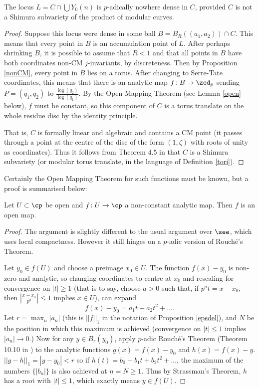 \documentclass[12pt,letterpaper]{article}
\begin{document}
	\begin{prop}
		The locus $L=C\cap \bigcup Y_0(n)$ is $p$-adically nowhere dense in $C$, provided $C$ is not a Shimura subvariety of the product of modular curves.
	\end{prop}
	
	\begin{proof}
		Suppose this locus were dense in some ball $B = B_R((a_1,a_2))\cap C$. This means that every point in $B$ is an accumulation point of $L$. After perhaps shrinking $B$, it is possible to assume that $R<1$ and that all points in $B$ have both coordinates non-CM $j$-invariants, by discreteness. Then by Proposition \ref{nonCM}, every point in $B$ lies on a torus. After changing to Serre-Tate coordinates, this means that there is an analytic map $f\colon B\to \zed_p$ sending $P = (q_1,q_2)$ to $\frac{\log(q_2)}{\log(q_1)}$. By the Open Mapping Theorem (see Lemma \ref{open} below), $f$ must be constant, so this component of $C$ is a torus translate on the whole residue disc by the identity principle.
		
		That is, $C$ is formally linear and algebraic and contains a CM point (it passes through a point at the centre of the disc of the form $(1,\zeta)$ with roots of unity as coordinates). Thus it follows from Theorem 4.5 in \cite{Moo98II} that $C$ is a Shimura subvariety (or modular torus translate, in the language of Definition \ref{tori}).
	\end{proof}
	
	Certainly the Open Mapping Theorem for such functions must be known, but a proof is summarised below:
	
	
	\begin{lemma}\label{open}
		Let $U\subset \cp$ be open and  $f\colon U\to \cp$ a non-constant analytic map. Then $f$ is an open map.
	\end{lemma}
	
	\begin{proof}
		The argument is slightly different to the usual argument over $\see$, which uses local compactness. However it still hinges on a $p$-adic version of Rouch\'e's Theorem.
		
		Let $y_0\in f(U)$ and choose a preimage $x_0\in U$. The function $f(x)-y_0$ is non-zero and analytic, so changing coordinates to centre at $x_0$ and rescaling for convergence on $|t|\geq 1$ (that is to say, choose $a>0$ such that, if $p^at =  x-x_0$, then  $|\frac{x-x_0}{p^{a}}|\leq1$ implies $x\in U$), can expand
		\[f(x)-y_0 = a_1t + a_2t^2 + ....\]
		Let $r = \max_n|a_n|$ (this is $||f||_1$ in the notation of Proposition \ref{epsdel}), and $N$ be the position in which this maximum is achieved (convergence on $|t|\leq1$ implies $|a_n|\to0$.) Now for any $y\in B_r(y_0)$, apply $p$-adic Rouch\'e's Theorem (Theorem 10.10 in \cite{Con}) to the analytic functions $g(x) =f(x)-y_0$ and $h(x)=f(x)-y$. $||g-h||_1 = |y-y_0|<r$ so if $h(t) = b_0+b_1t+b_2 t^2+...$, the maximum of the numbers $\{|b_n|\}$ is also achieved at $n=N\geq 1$. Thus by Strassman's Theorem, $h$ has a root with $|t|\leq 1$, which exactly means $y\in f(U)$.		
	\end{proof}
	
\end{document}
